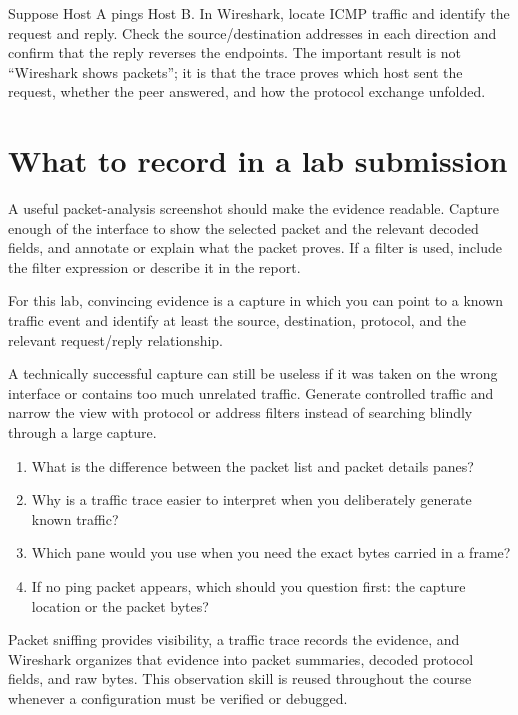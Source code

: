 \begin{workedexample}
Suppose Host A pings Host B. In Wireshark, locate ICMP traffic and identify the request and reply. Check the source/destination addresses in each direction and confirm that the reply reverses the endpoints. The important result is not ``Wireshark shows packets''; it is that the trace proves which host sent the request, whether the peer answered, and how the protocol exchange unfolded.
\end{workedexample}

\section{What to record in a lab submission}
A useful packet-analysis screenshot should make the evidence readable. Capture enough of the interface to show the selected packet and the relevant decoded fields, and annotate or explain what the packet proves. If a filter is used, include the filter expression or describe it in the report.

\begin{verifybox}
For this lab, convincing evidence is a capture in which you can point to a known traffic event and identify at least the source, destination, protocol, and the relevant request/reply relationship.
\end{verifybox}

\begin{pitfall}
A technically successful capture can still be useless if it was taken on the wrong interface or contains too much unrelated traffic. Generate controlled traffic and narrow the view with protocol or address filters instead of searching blindly through a large capture.
\end{pitfall}

\begin{quickcheck}
\begin{enumerate}
\item What is the difference between the packet list and packet details panes?
\item Why is a traffic trace easier to interpret when you deliberately generate known traffic?
\item Which pane would you use when you need the exact bytes carried in a frame?
\item If no ping packet appears, which should you question first: the capture location or the packet bytes?
\end{enumerate}
\end{quickcheck}

\begin{chapterrecap}
Packet sniffing provides visibility, a traffic trace records the evidence, and Wireshark organizes that evidence into packet summaries, decoded protocol fields, and raw bytes. This observation skill is reused throughout the course whenever a configuration must be verified or debugged.
\end{chapterrecap}
